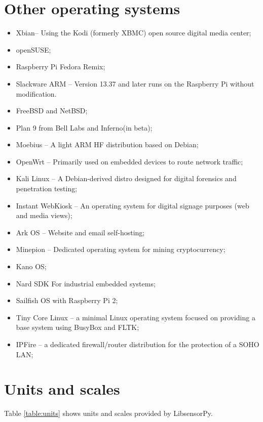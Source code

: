 \documentclass{acm_proc_article-sp}
\begin{document}
\section{Other operating systems}\label{sec:RPiOS}
\begin{itemize}
\item Xbian– Using the Kodi (formerly XBMC) open source digital media center;
\item openSUSE;
\item Raspberry Pi Fedora Remix;
\item Slackware ARM – Version 13.37 and later runs on the Raspberry Pi without modification.
\item FreeBSD and NetBSD;
\item Plan 9 from Bell Labs and Inferno(in beta);
\item Moebius – A light ARM HF distribution based on Debian;
\item OpenWrt – Primarily used on embedded devices to route network traffic;
\item Kali Linux – A Debian-derived distro designed for digital forensics and penetration testing;
\item Instant WebKiosk – An operating system for digital signage purposes (web and media views);
\item Ark OS – Website and email self-hosting;
\item Minepion – Dedicated operating system for mining cryptocurrency;
\item Kano OS;
\item Nard SDK For industrial embedded systems;
\item Sailfish OS with Raspberry Pi 2;
\item Tiny Core Linux – a minimal Linux operating system focused on providing a base system using BusyBox and FLTK;
\item IPFire – a dedicated firewall/router distribution for the protection of a SOHO LAN;
\end{itemize}

\newpage

\section{Units and scales}\label{sec:Units}
Table \ref{table:units} shows units and scales provided by LibsensorPy.
\end{document}
